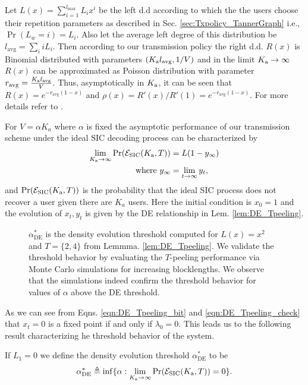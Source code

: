 Let $L(x)=\sum_{i=1}^{l_{\max}} L_i x^i$ be the left d.d according to which the the users choose their repetition parameters as described in Sec. \ref{sec:Txpolicy_TannerGraph} i.e., $\Pr(L_{w}=i)=L_i$. Also let the average left degree of this distribution be $l_{\text{avg}}=\sum_i iL_i$. Then according to our transmission policy the right d.d. $R(x)$ is Binomial distributed with parameters $(K_{\text{a}} l_{\text{avg}},1/V)$  and in the limit $K_{\text{a}}\rightarrow \infty$ $R(x)$ can be approximated as Poisson distribution with parameter $r_{\text{avg}}=\frac{K_{\text{a}} l_{\text{avg}}}{V}$. Thus, asymptotically in $K_{\text{a}}$, it can be seen that $R(x)=e^{-r_{\text{avg}}(1-x)}$ and $\rho(x)=R'(x)/R'(1)=e^{-r_{\text{avg}}(1-x)}$. For more details refer to \cite{narayanan2012iterative}.

\begin{lemma} For $V=\alpha K_a$ where $\alpha$ is fixed the asymptotic performance of our transmission scheme under the ideal SIC decoding process can be characterized by %
\begin{align*}
\lim_{K_{\text{a}}\rightarrow \infty} \mathrm{Pr}(\mathcal{E}_{\text{SIC}}(K_{\text{a}},T))&=L(1-y_{\infty})\notag\\
\text{ where } y_{\infty} &=\lim_{t\rightarrow\infty} y_t,
\end{align*}
and $\mathrm{Pr}(\mathcal{E}_{\text{SIC}}(K_{\text{a}},T))$ is the probability that the ideal SIC process does not recover a user given there  are $K_a$ users. Here the initial condition is $x_0=1$ and the evolution of $x_t,y_t$ is given by the DE relationship in Lem. \ref{lem:DE_Tpeeling}.
\label{lem:asymptotic_SIC}
\end{lemma}

\begin{figure}[h!]
  \centering
  \resizebox{0.85\textwidth}{!}{}
  \caption{$\alpha^*_{\text{DE}}$ is the density evolution threshold computed for $L(x)=x^2$ and $T=\{2,4\}$ from Lemmma. \eqref{lem:DE_Tpeeling}. We validate the threshold behavior by evaluating the $T$-peeling performance via Monte Carlo simulations for increasing blocklengths. We observe that the simulations indeed confirm the threshold behavior for values of $\alpha$ above the DE threshold.}
  \label{fig:DEvBP}
\end{figure}

As we can see from Eqns. \eqref{eqn:DE_Tpeeling_bit} and \eqref{eqn:DE_Tpeeling_check} that $x_t=0$ is a fixed point if and only if $\lambda_0=0$. This leads us to the following result characterizing he threshold behavior of the system.
\begin{definition}
If $L_1=0$ we define the density evolution threshold $\alpha^*_{\text{DE}}$ to be
\[
\alpha^*_{\text{DE}}\triangleq \inf \{\alpha: \lim_{K_{\text{a}}\rightarrow \infty} \mathrm{Pr}(\mathcal{E}_{\text{SIC}}(K_{\text{a}},T))=0\}.
\]
\label{def:DE_threshold}
\end{definition}

